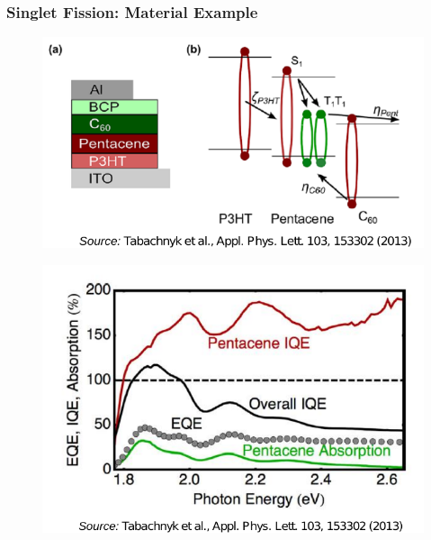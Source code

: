 \documentclass[compress]{beamer}
\begin{document}
\begin{frame}
  \frametitle{Singlet Fission: Material Example}
\vspace{-10pt}
\hspace{-30pt}
\begin{figure}[H]
\hspace{-10pt}\includegraphics[width=.7\columnwidth]{../img/SF_esq4.pdf}
\end{figure}

\begin{multicols}{2}

\begin{figure}[H]
\vspace{-40pt}\includegraphics[width=1\columnwidth]{../img/SF_esq5.pdf}
\end{figure}


\end{multicols}
\end{frame}
\end{document}
